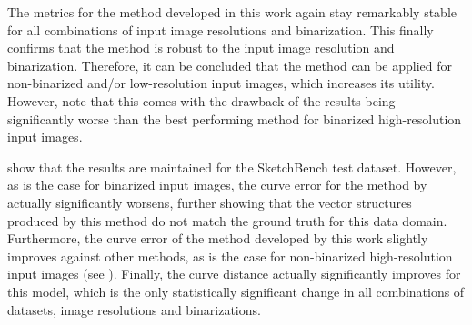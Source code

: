 The metrics for the method developed in this work again stay remarkably stable for all combinations of input image resolutions and binarization. This finally confirms that the method is robust to the input image resolution and binarization. Therefore, it can be concluded that the method can be applied for non-binarized and/or low-resolution input images, which increases its utility. However, note that this comes with the drawback of the results being significantly worse than the best performing method for binarized high-resolution input images.

 show that the results are maintained for the SketchBench test dataset. However, as is the case for binarized input images, the curve error for the method by \citet{Puhachov2021KeypointPolyvector} actually significantly worsens, further showing that the vector structures produced by this method do not match the ground truth for this data domain. Furthermore, the curve error of the method developed by this work slightly improves against other methods, as is the case for non-binarized high-resolution input images (see ). Finally, the curve distance actually significantly improves for this model, which is the only statistically significant change in all combinations of datasets, image resolutions and binarizations.

